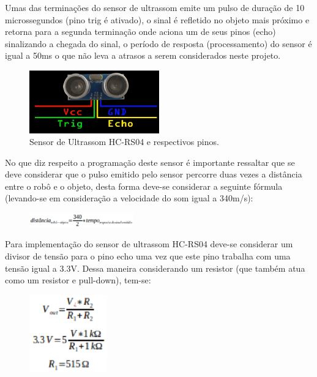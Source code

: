 Umas das terminações do sensor de ultrassom emite um pulso de duração de 10 microssegundos (pino trig é ativado), o sinal é refletido no objeto mais próximo e retorna para a segunda terminação onde aciona um de seus pinos (echo) sinalizando a chegada do sinal, o período de resposta (processamento) do sensor é igual a 50ms o que não leva a atrasos a serem considerados neste projeto. 

\begin{figure}[H]
    \centering
    \includegraphics[width=0.5\textwidth]{figuras/pinos_ultrassom.eps}
    \caption{Sensor de Ultrassom HC-RS04 e respectivos pinos.}
    \label{fig:catia01}
\end{figure}

No que diz respeito a programação deste sensor é importante ressaltar que se deve considerar que o pulso emitido pelo sensor percorre duas vezes a distância entre o robô e o objeto, desta forma deve-se considerar a seguinte fórmula (levando-se em consideração a velocidade do som igual a 340m/s):

\begin{figure}[H]
    \centering
    \includegraphics[width=0.4\textwidth]{figuras/distancia.eps}
    \caption{}
    \label{fig:catia01}
\end{figure}

Para implementação do sensor de ultrassom HC-RS04 deve-se considerar um divisor de tensão para o pino echo uma vez que este pino trabalha com uma tensão igual a 3.3V. Dessa maneira considerando um resistor  (que também atua como um resistor e pull-down), tem-se:

\begin{figure}[H]
    \centering
    \includegraphics[width=0.3\textwidth]{figuras/vout.eps}
    \caption{}
    \label{fig:catia01}
\end{figure}


